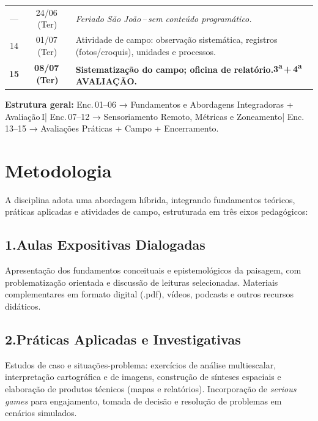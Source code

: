 \documentclass[11pt,a4paper]{article}
\begin{document}
\begin{small}
\begin{tabularx}{\textwidth}{@{}c c X@{}}
\rowcolor{uefslight}
--- & 24/06\,(Ter) & \textit{Feriado São João\,--\,sem conteúdo programático.} \\
14 & 01/07\,(Ter) & Atividade de campo: observação sistemática, registros (fotos/croquis), unidades e processos. \\
\rowcolor{uefslight!70!white}
\textbf{15} & \textbf{08/07\,(Ter)} & \textbf{Sistematização do campo; oficina de relatório.\enspace\textsf{3\textsuperscript{a}\,+\,4\textsuperscript{a}\,AVALIAÇÃO}.} \\
\bottomrule
\end{tabularx}
\end{small}

\begin{tcolorbox}[uefsbox]
\textbf{Estrutura geral:}\enspace
Enc.\,01--06 → Fundamentos e Abordagens Integradoras + Avaliação\,I\enspace|\enspace
Enc.\,07--12 → Sensoriamento Remoto, Métricas e Zoneamento\enspace|\enspace
Enc.\,13--15 → Avaliações Práticas + Campo + Encerramento.
\end{tcolorbox}

\section*{Metodologia}

A disciplina adota uma abordagem híbrida, integrando fundamentos teóricos, práticas aplicadas e atividades de campo, estruturada em três eixos pedagógicos:

\subsection*{1.\enspace Aulas Expositivas Dialogadas}
Apresentação dos fundamentos conceituais e epistemológicos da paisagem, com problematização orientada e discussão de leituras selecionadas. Materiais complementares em formato digital (.pdf), vídeos, podcasts e outros recursos didáticos.

\subsection*{2.\enspace Práticas Aplicadas e Investigativas}
Estudos de caso e situações-problema: exercícios de análise multiescalar, interpretação cartográfica e de imagens, construção de sínteses espaciais e elaboração de produtos técnicos (mapas e relatórios). Incorporação de \textit{serious games} para engajamento, tomada de decisão e resolução de problemas em cenários simulados.
\end{document}
